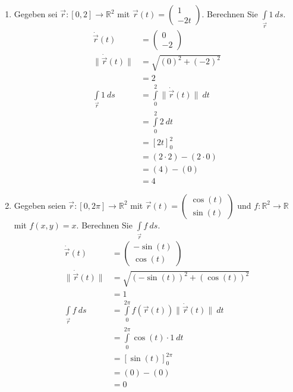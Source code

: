 \documentclass[12pt]{article}
\begin{document}

\noindent
\begin{enumerate}[start=1,label={\bfseries Frage \arabic*:},leftmargin=1in]

    \item Gegeben sei $\Vec{r}:[0,2] \to \mathbb{R}^2$ mit $\Vec{r}(t) = \begin{pmatrix} 1 \\ -2t \end{pmatrix}$. Berechnen Sie $\int\limits_{\Vec{r}} 1 \: ds$.
    \begin{align*}
        \Dot{\Vec{r}}(t) &= \begin{pmatrix} 0 \\ -2 \end{pmatrix} \\
        \lVert \Dot{\Vec{r}}(t) \rVert &= \sqrt{(0)^2 + (-2)^2} \\
        &= 2 \\
        \int\limits_{\Vec{r}} 1 \: ds &= \int\limits_0^2 \lVert \Dot{\Vec{r}}(t) \rVert \: dt \\
        &= \int\limits_0^2 2 \: dt \\
        &= \left[2t\right]_0^2 \\
        &= (2 \cdot 2) - (2 \cdot 0) \\
        &= (4) - (0) \\
        &= 4
    \end{align*}

    \item Gegeben seien $\Vec{r}:[0,2\pi] \to \mathbb{R}^2$ mit $\Vec{r}(t) = \begin{pmatrix} \cos{(t)} \\ \sin{(t)} \end{pmatrix}$ und $f:\mathbb{R}^2 \to \mathbb{R}$ mit $f(x,y)=x$. Berechnen Sie $\int\limits_{\Vec{r}} f \: ds$.
    \begin{align*}
        \Dot{\Vec{r}}(t) &= \begin{pmatrix} -\sin{(t)} \\ \cos{(t)} \end{pmatrix} \\
        \lVert \Dot{\Vec{r}}(t) \rVert &= \sqrt{(-\sin{(t)})^2 + (\cos{(t)})^2} \\
        &= 1 \\
        \int\limits_{\Vec{r}} f \: ds &= \int\limits_0^{2\pi} f(\Vec{r}(t)) \lVert \Dot{\Vec{r}}(t) \rVert \: dt \\
        &= \int\limits_0^{2\pi} \cos{(t)} \cdot 1 \: dt \\
        &= \left[\sin{(t)}\right]_0^{2\pi} \\
        &= (0) - (0) \\
        &= 0
    \end{align*}


\end{enumerate}
\end{document}
